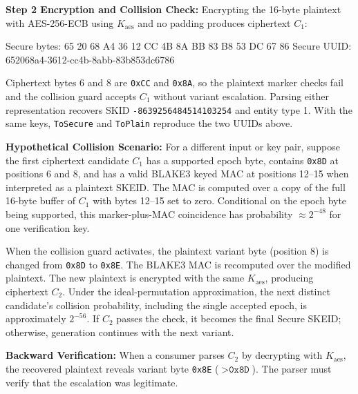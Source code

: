 \documentclass[a4paper,fleqn]{cas-sc}
\newenvironment{Shaded}{}{}
\newcommand{\NormalTok}[1]{#1}
\begin{document}
\textbf{Step 2 Encryption and Collision Check:} Encrypting the 16-byte
plaintext with AES-256-ECB using \(K_{\mathrm{aes}}\) and no padding
produces ciphertext \(C_1\):

\begin{Shaded}
\begin{Highlighting}[]
\NormalTok{Secure bytes: 65 20 68 A4 36 12 CC 4B 8A BB 83 B8 53 DC 67 86}
\NormalTok{Secure UUID:  652068a4{-}3612{-}cc4b{-}8abb{-}83b853dc6786}
\end{Highlighting}
\end{Shaded}

Ciphertext bytes 6 and 8 are \texttt{0xCC} and \texttt{0x8A}, so the
plaintext marker checks fail and the collision guard accepts \(C_1\)
without variant escalation. Parsing either representation recovers SKID
\texttt{-8639256484514103254} and entity type 1. With the same keys,
\texttt{ToSecure} and \texttt{ToPlain} reproduce the two UUIDs above.

\textbf{Hypothetical Collision Scenario:} For a different input or key
pair, suppose the first ciphertext candidate \(C_1\) has a supported
epoch byte, contains \texttt{0x8D} at positions 6 and 8, and has a valid
BLAKE3 keyed MAC at positions 12--15 when interpreted as a plaintext
SKEID. The MAC is computed over a copy of the full 16-byte buffer of
\(C_1\) with bytes 12--15 set to zero. Conditional on the epoch byte
being supported, this marker-plus-MAC coincidence has probability
\(\approx 2^{-48}\) for one verification key.

When the collision guard activates, the plaintext variant byte (position
8) is changed from \texttt{0x8D} to \texttt{0x8E}. The BLAKE3 MAC is
recomputed over the modified plaintext. The new plaintext is encrypted
with the same \(K_{\mathrm{aes}}\), producing ciphertext \(C_2\). Under
the ideal-permutation approximation, the next distinct candidate's
collision probability, including the single accepted epoch, is
approximately \(2^{-56}\). If \(C_2\) passes the check, it becomes the
final Secure SKEID; otherwise, generation continues with the next
variant.

\textbf{Backward Verification:} When a consumer parses \(C_2\) by
decrypting with \(K_{\mathrm{aes}}\), the recovered plaintext reveals
variant byte \texttt{0x8E} (\(> \texttt{0x8D}\)). The parser must verify
that the escalation was legitimate.
\end{document}
